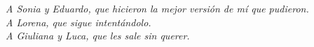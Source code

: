 
\pagestyle{empty}
\frontmatter

\chapter*{}
\begin{flushright}
\textit{A Sonia y Eduardo, que hicieron la mejor versión de mí que pudieron.\\
A Lorena, que sigue intentándolo.\\
A Giuliana y Luca, que les sale sin querer.}
\end{flushright}